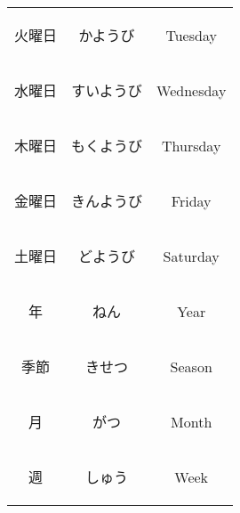\begin{center}
\begin{table}[H]
\begin{tabular}{ccc}
		{\begin{CJK}{UTF8}{min} 火曜日 \end{CJK}} & {\begin{CJK}{UTF8}{min} かようび \end{CJK}} & Tuesday \\
		{\begin{CJK}{UTF8}{min} 水曜日 \end{CJK}} & {\begin{CJK}{UTF8}{min} すいようび \end{CJK}} & Wednesday \\
		{\begin{CJK}{UTF8}{min} 木曜日 \end{CJK}} & {\begin{CJK}{UTF8}{min} もくようび \end{CJK}} & Thursday \\
		{\begin{CJK}{UTF8}{min} 金曜日 \end{CJK}} & {\begin{CJK}{UTF8}{min} きんようび \end{CJK}} & Friday \\
		{\begin{CJK}{UTF8}{min} 土曜日 \end{CJK}} & {\begin{CJK}{UTF8}{min} どようび \end{CJK}} & Saturday \\
		\midrule
		{\begin{CJK}{UTF8}{min} 年 \end{CJK}} & {\begin{CJK}{UTF8}{min} ねん \end{CJK}} & Year \\
		{\begin{CJK}{UTF8}{min} 季節 \end{CJK}} & {\begin{CJK}{UTF8}{min} きせつ \end{CJK}} & Season \\
		{\begin{CJK}{UTF8}{min} 月 \end{CJK}} & {\begin{CJK}{UTF8}{min} がつ \end{CJK}} & Month \\
		{\begin{CJK}{UTF8}{min} 週 \end{CJK}} & {\begin{CJK}{UTF8}{min} しゅう \end{CJK}} & Week \\

\end{tabular}
\end{table}
\end{center}
